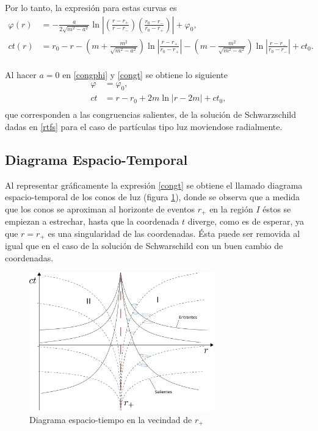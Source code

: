 Por lo tanto, la expresi\'on para estas curvas es
\begin{equation}
\begin{aligned}
\varphi(r)&=-\frac{a}{2\sqrt{m^2-a^2}}\ln \left|\left(\frac{r-r_+}{r-r_-}\right)\left(\frac{r_0-r_-}{r_0-r_+} \right)\right| + \varphi_0 ,\\
ct(r)&=r_0-r-\left(m+\frac{m^2}{\sqrt{m^2-a^2}} \right)\ln\left|\frac{r-r_+}{r_0-r_+}\right|-\left(m-\frac{m^2}{\sqrt{m^2-a^2}} \right)\ln \left|\frac{r-r_-}{r_0-r_-}\right|+ct_0.\\
\end{aligned}
\end{equation}

Al hacer $a=0$ en \eqref{congphi} y \eqref{congt} se obtiene lo siguiente
\begin{equation}
\begin{aligned}
\varphi &=\varphi_0 ,\\
ct&=r-r_0+2m\ln|r-2m|+ct_0,\\
\end{aligned}
\end{equation}
que corresponden a las congruencias salientes, de la soluci\'on de Schwarzschild dadas en \eqref{rtfs} para el caso de part\'iculas tipo luz moviendose radialmente.\\

\subsection{Diagrama Espacio-Temporal}

Al representar gr\'aficamente la expresi\'on \eqref{congt} se obtiene el llamado diagrama espacio-temporal de los conos de luz (figura \ref{fig:conos1}), donde se observa que a medida que los conos se aproximan al horizonte de eventos $r_+$ en la regi\'on $I$ \'estos se empiezan a estrechar, hasta que la coordenada $t$ diverge, como es de esperar, ya que $r=r_+$ es una singularidad de las coordenadas. \'Esta puede ser removida al igual que en el caso de la soluci\'on de Schwarschild con un buen cambio de coordenadas.

 \begin{figure}[H]
 \centering
\includegraphics[height=6cm,angle=0]{fig/fig-conos1.pdf}
\caption{Diagrama espacio-tiempo en la vecindad de $r_+$}
\label{fig:conos1}
\end{figure}
  
